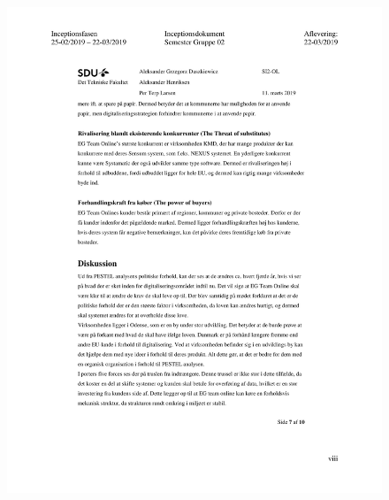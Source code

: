 \begin{figure}[hb]
  \includegraphics[scale = 0.33]{./PNG/Inceptions/Gruppe02+InceptionsDokument-41.jpg} 
\end{figure}

